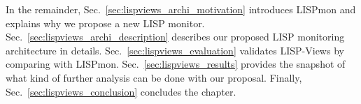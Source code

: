 In the remainder, Sec.~\ref{sec:lispviews_archi_motivation} introduces LISPmon and explains why we propose a new LISP monitor. Sec.~\ref{sec:lispviews_archi_description} describes our proposed LISP monitoring architecture in details. Sec.~\ref{sec:lispviews_evaluation} validates LISP-Views by comparing with LISPmon. Sec.~\ref{sec:lispviews_results} provides the snapshot of what kind of further analysis can be done with our proposal. Finally, Sec.~\ref{sec:lispviews_conclusion} concludes the chapter. 


%




